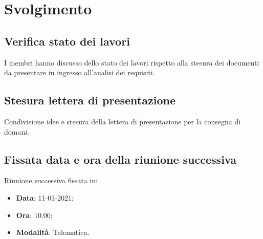 \documentclass[]{article}
\begin{document}
	\newpage

	\section{Svolgimento}
		\subsection{Verifica stato dei lavori}
		I membri hanno discusso dello stato dei lavori rispetto alla stesura dei documenti da presentare in ingresso all'analisi dei requisiti.
		
		\subsection{Stesura lettera di presentazione}
		Condivisione idee e stesura della lettera di presentazione per la consegna di domani.
		
		\subsection{Fissata data e ora della riunione successiva}
		Riunione successiva fissata in:
		\begin{itemize}
			\item \textbf{Data}: 11-01-2021;
			\item \textbf{Ora}: 10.00;
			\item \textbf{Modalità}: Telematica.
		\end{itemize}
	
\end{document}

